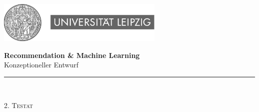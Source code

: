 

\begin{titlepage}
\begin{center}





\begin{flushright}
\includegraphics[width=0.6\textwidth]{img/unileipziglogo.jpg}\\[5cm]
\end{flushright}



\newcommand{\HRule}{\rule{\linewidth}{0.5mm}}
{\huge \bfseries Recommendation \& Machine Learning}\\[0.5cm]
{\Large Konzeptioneller Entwurf}\\
\HRule \\[2.5cm]

\begin{flushleft}
\textsc{\Large 2. Testat }\\[0.25cm]
\end{flushleft}

\begin{minipage}[t]{.7\textwidth}%
\end{minipage}%
\begin{minipage}[t]{.3\textwidth}%
\begin{flushright}
  \end{flushright}
\end{minipage}\\[3.5cm]


\vfill %


\end{center}
\end{titlepage}
